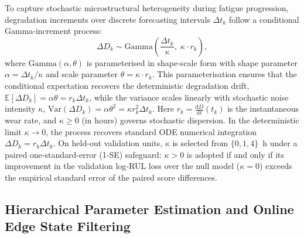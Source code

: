 \documentclass[a4paper,fleqn]{cas-dc}
\begin{document}
To capture stochastic microstructural heterogeneity during fatigue progression, degradation increments over discrete forecasting intervals $\Delta t_k$ follow a conditional Gamma-increment process:
\begin{equation}
    \Delta D_k \sim \mathrm{Gamma}\left(\frac{\Delta t_k}{\kappa}, \; \kappa \cdot r_k\right),
    \label{eq:gamma_increments}
\end{equation}
where $\mathrm{Gamma}(\alpha, \theta)$ is parameterised in shape-scale form with shape parameter $\alpha = \Delta t_k / \kappa$ and scale parameter $\theta = \kappa \cdot r_k$. This parameterisation ensures that the conditional expectation recovers the deterministic degradation drift, $\mathbb{E}[\Delta D_k] = \alpha \theta = r_k \Delta t_k$, while the variance scales linearly with stochastic noise intensity $\kappa$, $\mathrm{Var}(\Delta D_k) = \alpha \theta^2 = \kappa r_k^2 \Delta t_k$. Here $r_k = \frac{\mathrm{d}D}{\mathrm{d}t}(t_k)$ is the instantaneous wear rate, and $\kappa \ge 0$ (in hours) governs stochastic dispersion. In the deterministic limit $\kappa \to 0$, the process recovers standard ODE numerical integration $\Delta D_k = r_k \Delta t_k$. On held-out validation units, $\kappa$ is selected from $\{0, 1, 4\}$~h under a paired one-standard-error (1-SE) safeguard: $\kappa > 0$ is adopted if and only if its improvement in the validation log-RUL loss over the null model ($\kappa = 0$) exceeds the empirical standard error of the paired score differences.

\subsection{Hierarchical Parameter Estimation and Online Edge State Filtering}
\label{subsec:hierarchical_estimation}
\end{document}

